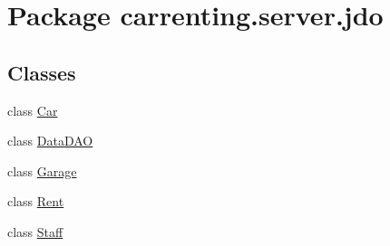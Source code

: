 \hypertarget{namespacecarrenting_1_1server_1_1jdo}{}\section{Package carrenting.\+server.\+jdo}
\label{namespacecarrenting_1_1server_1_1jdo}
\subsection*{Classes}
\begin{DoxyCompactItemize}
\item 
class \mbox{\hyperlink{classcarrenting_1_1server_1_1jdo_1_1_car}{Car}}
\item 
class \mbox{\hyperlink{classcarrenting_1_1server_1_1jdo_1_1_data_d_a_o}{Data\+D\+AO}}
\item 
class \mbox{\hyperlink{classcarrenting_1_1server_1_1jdo_1_1_garage}{Garage}}
\item 
class \mbox{\hyperlink{classcarrenting_1_1server_1_1jdo_1_1_rent}{Rent}}
\item 
class \mbox{\hyperlink{classcarrenting_1_1server_1_1jdo_1_1_staff}{Staff}}
\end{DoxyCompactItemize}
